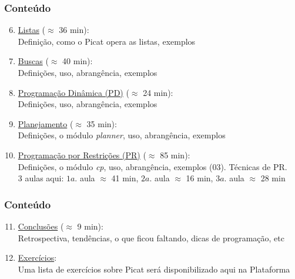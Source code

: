 			
\begin{frame}[fragile]
  \frametitle{Conteúdo}
  
  \begin{enumerate}

   \setcounter{enumi}{5}
    \item  \underline{Listas} ($\approx$ 36 min):\\
    Definição, como o Picat opera as listas, exemplos


    \pause
    \item  \underline{Buscas} ($\approx$ 40 min):\\
    Definições, uso, abrangência, exemplos

    \pause
    \item \underline{Programação Dinâmica (PD)} ($\approx$ 24 min):\\
        Definições, uso, abrangência, exemplos

    
    \pause
    \item \underline{Planejamento} ($\approx$ 35 min):\\
        Definições, o módulo \textit{planner}, uso, abrangência, exemplos

    \pause
		\item \underline{Programação por Restrições (PR)} ($\approx$ 85 min):\\
      Definições, o módulo \textit{cp}, uso, abrangência, exemplos (03).
      Técnicas de PR.\\
      3 aulas aqui: $1a.$ aula $\approx$ 41 min, $2a.$ aula $\approx$ 16 min,
      $3a.$ aula $\approx$ 28 min
      
    
\end{enumerate}

\end{frame}


			
\begin{frame}[fragile]
  \frametitle{Conteúdo}
  
  \begin{enumerate}

   \setcounter{enumi}{10}

		\item  \underline{Conclusões} ($\approx$ 9 min):\\
    Retrospectiva, tendências, o que ficou faltando, dicas de programação, etc

    \pause
		\item  \underline{Exercícios}: \\
    Uma lista de exercícios sobre Picat será disponibilizado aqui na Plataforma

    
\end{enumerate}

\end{frame}



